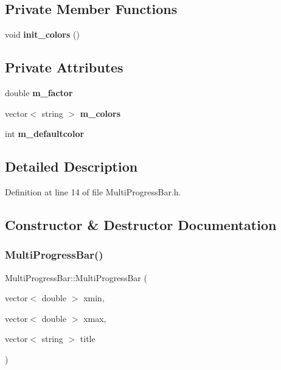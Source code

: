 \subsection*{Private Member Functions}
\begin{DoxyCompactItemize}
\item 
void \textbf{ init\+\_\+colors} ()
\end{DoxyCompactItemize}
\subsection*{Private Attributes}
\begin{DoxyCompactItemize}
\item 
double \textbf{ m\+\_\+factor}
\item 
vector$<$ string $>$ \textbf{ m\+\_\+colors}
\item 
int \textbf{ m\+\_\+defaultcolor}
\end{DoxyCompactItemize}


\subsection{Detailed Description}


Definition at line 14 of file Multi\+Progress\+Bar.\+h.



\subsection{Constructor \& Destructor Documentation}
\mbox{\label{classMultiProgressBar_aaab5d64069e511a0c5c5f029936506d7_aaab5d64069e511a0c5c5f029936506d7}} 
\subsubsection{Multi\+Progress\+Bar()\hspace{0.1cm}{\footnotesize\ttfamily [1/2]}}
{\footnotesize\ttfamily Multi\+Progress\+Bar\+::\+Multi\+Progress\+Bar (\begin{DoxyParamCaption}\item[{vector$<$ double $>$}]{xmin,  }\item[{vector$<$ double $>$}]{xmax,  }\item[{vector$<$ string $>$}]{title }\end{DoxyParamCaption})}



